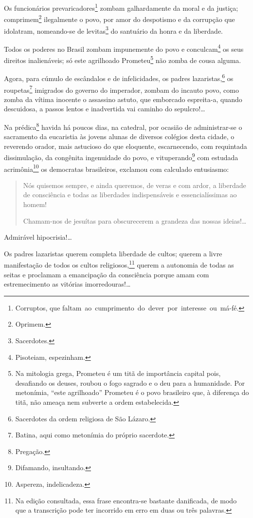 Os funcionários prevaricadores\footnote{Corruptos, que
  faltam~ao~cumprimento~do~dever~por~interesse~ou~má-fé.} zombam
galhardamente da moral e da justiça; comprimem\footnote{Oprimem.}
ilegalmente o povo, por amor do despotismo e da corrupção que idolatram,
nomeando-se de levitas\footnote{Sacerdotes.} do santuário da honra e
da liberdade.

Todos os poderes no Brasil zombam impunemente do povo e
conculcam\footnote{Pisoteiam, espezinham.} os seus direitos
inalienáveis; só este agrilhoado Prometeu\footnote{Na mitologia grega,
  Prometeu é um titã de importância capital pois, desafiando os deuses,
  roubou o fogo sagrado e o deu para a humanidade. Por metonímia, ``este
  agrilhoado'' Prometeu é o povo brasileiro que, à diferença do titã, não
  ameaça nem subverte a ordem estabelecida.} não zomba de cousa alguma.

Agora, para cúmulo de escândalos e de infelicidades, os padres
lazaristas,\footnote{Sacerdotes da ordem religiosa de São Lázaro.} os
roupetas\footnote{Batina, aqui como metonímia do próprio sacerdote.}
imigrados do governo do imperador, zombam do incauto povo, como zomba da
vítima inocente o assassino astuto, que emborcado espreita-a, quando
descuidosa, a passos lentos e inadvertida vai caminho do sepulcro!\ldots{} %

Na prédica\footnote{Pregação.} havida há poucos dias, na catedral, por
ocasião de administrar-se o sacramento da eucaristia às jovens alunas de
diversos colégios desta cidade, o reverendo orador, mais astucioso do
que eloquente, escarnecendo, com requintada dissimulação, da congênita
ingenuidade do povo, e vituperando\footnote{Difamando, insultando.}
com estudada acrimônia\footnote{Aspereza, indelicadeza.} os democratas
brasileiros, exclamou com calculado entusiasmo:


\begin{quote}
Nós quisemos sempre, e ainda queremos, de veras e com ardor, a
liberdade de consciência e todas as liberdades indispensáveis e
essencialíssimas ao homem!

Chamam-nos de jesuítas para obscurecerem a grandeza das nossas
ideias!\ldots{}
\end{quote}

Admirável hipocrisia!\ldots{}

Os padres lazaristas querem completa liberdade de cultos; querem a livre
manifestação de todos os cultos religiosos,\footnote{Na edição
  consultada, essa frase encontra-se bastante danificada, de modo que a
  transcrição pode ter incorrido em erro em duas ou três palavras.}
querem a autonomia de todas as seitas e proclamam a emancipação da
consciência porque amam com estremecimento as vitórias
imorredouras!\ldots

